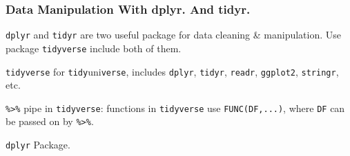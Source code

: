 \subsubsection{Data Manipulation With dplyr. And tidyr.}
    \lstinline|dplyr| and \lstinline|tidyr| are two useful package for data cleaning \& manipulation. Use package \lstinline|tidyverse| include both of them.

    \lstinline|tidyverse| for \lstinline|tidy|uni\lstinline|verse|, includes \lstinline|dplyr|, \lstinline|tidyr|, \lstinline|readr|, \lstinline|ggplot2|, \lstinline|stringr|, etc.

\begin{point}
    \lstinline|%>%| pipe in \lstinline|tidyverse|: functions in \lstinline|tidyverse| use \lstinline|FUNC(DF,...)|, where \lstinline|DF| can be passed on by \lstinline|%>%|.

\end{point}


\begin{point}
    \lstinline|dplyr| Package. 
\end{point}

